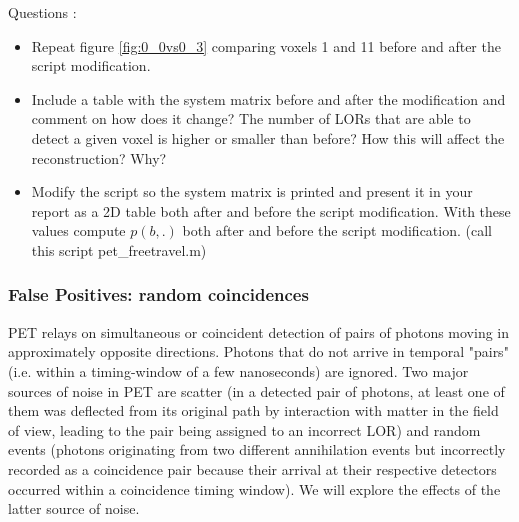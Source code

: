 \documentclass[12pt]{article} %
\newcounter{ejercicioNo}
\begin{document}
\begin{minipage}{\linewidth}
\begin{framed}
\addtocounter{ejercicioNo}{1} 
Questions : 
\begin{itemize}
   \item Repeat figure \ref{fig:0_0vs0_3} comparing voxels 1 and 11
   before and after the script modification.
   \item Include a table with the system matrix before and after the modification and comment on how does it change? The number of LORs that are able to detect a given voxel is higher or smaller than 
   before? How this will affect the reconstruction? Why? 
   \item Modify the script so the system matrix is printed and present it in your report as a 2D
   table both after and before the script modification. With these values compute $p(b,.)$ both after and before the script modification. (call this script pet\_freetravel.m)
\end{itemize}
\end{framed}
\end{minipage}


\subsubsection{False Positives: random coincidences}
\label{sec:FalsePositives}

PET relays on simultaneous or coincident detection of pairs of photons moving in approximately opposite directions. Photons that do not arrive in temporal "pairs" (i.e. within a timing-window of a few nanoseconds) are ignored.
Two major sources of noise in PET are scatter (in a detected pair of photons, at least one of them was deflected from its original path by interaction with matter in the field of view, leading to the pair being assigned to an incorrect LOR) and random events (photons originating from two different annihilation events but incorrectly recorded as a coincidence pair because their arrival at their respective detectors occurred within a coincidence timing window). We will explore the effects of the latter source of noise.
\end{document}
